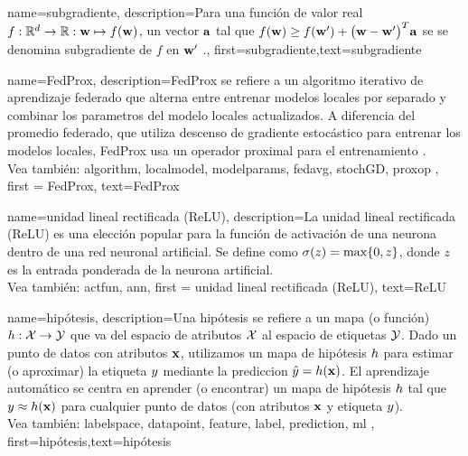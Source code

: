 {name={subgradiente},
description={Para una función de valor real $f: \mathbb{R}^{d} \rightarrow \mathbb{R}: {\bf w} \mapsto f({\bf w})$, 
		un vector ${\bf a}$ tal que $f({\bf w}) \geq  f({\bf w}') +\big({\bf w}-{\bf w}' \big)^{T} {\bf a}$ se 
		se denomina subgradiente de $f$ en ${\bf w}'$ \cite{BertCvxAnalOpt,BertsekasNonLinProgr}.},
	first={subgradiente},text={subgradiente} 
}



{name={FedProx},
	description={FedProx  se refiere a un algoritmo iterativo de aprendizaje federado que alterna entre entrenar modelos locales por separado y combinar los parametros del modelo locales actualizados. 
		A diferencia del promedio federado, que utiliza descenso de gradiente estocástico para entrenar los modelos locales, FedProx usa un operador proximal para el entrenamiento \cite{FedProx2020}.
		\\
		Vea también: \gls{algorithm}, \gls{localmodel}, \gls{modelparams}, \gls{fedavg}, \gls{stochGD}, \gls{proxop} }, 
	first = {FedProx}, text={FedProx} 
}

{name={unidad lineal rectificada (ReLU)},
	description={La unidad lineal rectificada (ReLU) es una elección popular para la 
		función de activación de una neurona dentro de una red neuronal artificial. Se define como  
		$\sigma(z) = \max\{0,z\}$, donde $z$ es la entrada ponderada de la neurona artificial.
		\\
		Vea también: \gls{actfun}, \gls{ann}}, 
	first = {unidad lineal rectificada (ReLU)}, text={ReLU} 
}

{name={hipótesis},
	description={Una hipótesis se refiere a un mapa (o función) $h: \mathcal{X} \rightarrow \mathcal{Y}$ que va del
		espacio de atributos $\mathcal{X}$ al espacio de etiquetas $\mathcal{Y}$. 
		Dado un punto de datos con atributos ${\bf x}$, utilizamos un mapa de hipótesis $h$
		para estimar (o aproximar) la etiqueta $y$ mediante la prediccion
		$\hat{y} = h({\bf x})$. El aprendizaje automático se centra en aprender (o encontrar) un mapa de hipótesis 
		$h$ tal que $y \approx h({\bf x})$ 
		para cualquier punto de datos (con atributos ${\bf x}$ y etiqueta $y$).
		\\
		Vea también: \gls{labelspace}, \gls{datapoint}, \gls{feature}, \gls{label}, \gls{prediction}, \Gls{ml}  },
	first={hipótesis},text={hipótesis}  
}



